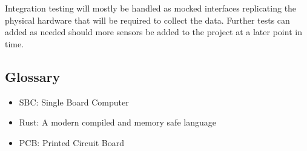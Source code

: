 Integration testing will mostly be handled as mocked interfaces
replicating the physical hardware that will be required to collect the
data. Further tests can added as needed should more sensors be added to
the project at a later point in time.

\hypertarget{glossary}{%
\subsection{Glossary}\label{glossary}}

\begin{itemize}
\tightlist
\item
  SBC: Single Board Computer
\item
  Rust: A modern compiled and memory safe language
\item
  PCB: Printed Circuit Board
\end{itemize}

